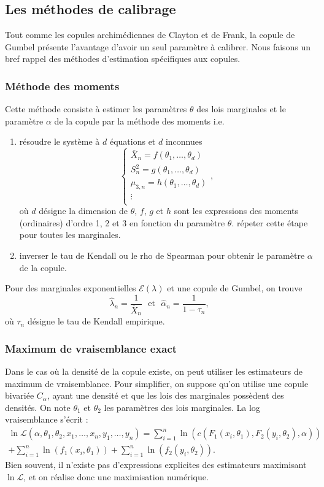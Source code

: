 \documentclass[11pt]{article}
\begin{document}
\subsection{Les m\'ethodes de calibrage}
Tout comme les copules archim\'ediennes de Clayton et de Frank, la copule de Gumbel pr\'esente l'avantage d'avoir un seul param\`etre \`a calibrer.
Nous faisons un bref rappel des m\'ethodes d'estimation sp\'ecifiques aux copules.

\subsubsection{M\'ethode des moments}
Cette m\'ethode consiste \`a estimer les param\`etres $\theta$ des lois marginales et le param\`etre $\alpha$ de la copule par la m\'ethode des moments i.e.
\begin{enumerate}
\item r\'esoudre le syst\`eme \`a $d$ \'equations et $d$ inconnues
$$
\left\{ \begin{array}{c}
\overline X_n = f(\theta_1,\dots,\theta_d)\\
S_n^2 = g(\theta_1,\dots,\theta_d)\\
\mu_{3,n} = h(\theta_1,\dots,\theta_d)\\
\vdots\\
\end{array}
\right. ,
$$
o\`u $d$ d\'esigne la dimension de $\theta$, $f$, $g$ et $h$ sont les expressions des moments (ordinaires) d'ordre 1, 2 et 3 en fonction du param\`etre $\theta$.
r\'epeter cette \'etape pour toutes les marginales.
\item inverser le tau de Kendall ou le rho de Spearman pour obtenir le param\`etre $\alpha$ de la copule.
\end{enumerate}

Pour des marginales exponentielles $\mathcal E(\lambda)$ et une copule de Gumbel, on trouve
$$
\hat \lambda_n = \frac{1}{\overline X_n}
\textrm{~~et~~}
\hat \alpha_n = \frac{1}{1-\tau_n},
$$
o\`u $\tau_n$ d\'esigne le tau de Kendall empirique. 


\subsubsection{Maximum de vraisemblance exact}
Dans le cas o\`u la densit\'e de la copule existe, on peut utiliser les estimateurs de maximum de vraisemblance. Pour simplifier, on suppose qu'on utilise une copule
bivari\'ee $C_\alpha$, ayant une densit\'e et que les lois des marginales poss\`edent des densit\'es. On note $\theta_1$ et $\theta_2$ les param\`etres des lois 
marginales. La log vraisemblance s'\'ecrit :
\begin{multline*}
\ln \mathcal L(\alpha, \theta_1, \theta_2, x_1,\dots, x_n, y_1,\dots, y_n) = \sum_{i=1}^n \ln\left( c \left( F_1(x_i,\theta_1), F_2(y_i,\theta_2),\alpha \right)\right) \\
+\sum_{i=1}^n \ln\left(f_1(x_i,\theta_1) \right) + \sum_{i=1}^n \ln\left(f_2(y_i,\theta_2) \right).
\end{multline*}
Bien souvent, il n'existe pas d'expressions explicites des estimateurs maximisant $\ln \mathcal L$, et on r\'ealise donc une maximisation num\'erique.
\end{document}
